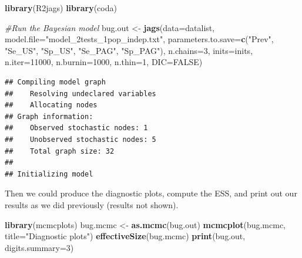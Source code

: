 \documentclass[
]{book}
\newenvironment{Shaded}{\begin{snugshade}}{\end{snugshade}}
\newcommand{\AttributeTok}[1]{\textcolor[rgb]{0.13,0.29,0.53}{#1}}
\newcommand{\CommentTok}[1]{\textcolor[rgb]{0.56,0.35,0.01}{\textit{#1}}}
\newcommand{\ConstantTok}[1]{\textcolor[rgb]{0.56,0.35,0.01}{#1}}
\newcommand{\DecValTok}[1]{\textcolor[rgb]{0.00,0.00,0.81}{#1}}
\newcommand{\FunctionTok}[1]{\textcolor[rgb]{0.13,0.29,0.53}{\textbf{#1}}}
\newcommand{\NormalTok}[1]{#1}
\newcommand{\OtherTok}[1]{\textcolor[rgb]{0.56,0.35,0.01}{#1}}
\newcommand{\StringTok}[1]{\textcolor[rgb]{0.31,0.60,0.02}{#1}}
\begin{document}
\begin{Shaded}
\begin{Highlighting}[]
\FunctionTok{library}\NormalTok{(R2jags)}
\FunctionTok{library}\NormalTok{(coda)}

\CommentTok{\#Run the Bayesian model}
\NormalTok{bug.out }\OtherTok{\textless{}{-}} \FunctionTok{jags}\NormalTok{(}\AttributeTok{data=}\NormalTok{datalist,                             }
               \AttributeTok{model.file=}\StringTok{"model\_2tests\_1pop\_indep.txt"}\NormalTok{,     }
               \AttributeTok{parameters.to.save=}\FunctionTok{c}\NormalTok{(}\StringTok{"Prev"}\NormalTok{, }\StringTok{"Se\_US"}\NormalTok{, }\StringTok{"Sp\_US"}\NormalTok{, }\StringTok{"Se\_PAG"}\NormalTok{, }\StringTok{"Sp\_PAG"}\NormalTok{),               }
               \AttributeTok{n.chains=}\DecValTok{3}\NormalTok{,                                 }
               \AttributeTok{inits=}\NormalTok{inits,                                }
               \AttributeTok{n.iter=}\DecValTok{11000}\NormalTok{,                                }
               \AttributeTok{n.burnin=}\DecValTok{1000}\NormalTok{,                              }
               \AttributeTok{n.thin=}\DecValTok{1}\NormalTok{,                                   }
               \AttributeTok{DIC=}\ConstantTok{FALSE}\NormalTok{)                                   }
\end{Highlighting}
\end{Shaded}

\begin{verbatim}
## Compiling model graph
##    Resolving undeclared variables
##    Allocating nodes
## Graph information:
##    Observed stochastic nodes: 1
##    Unobserved stochastic nodes: 5
##    Total graph size: 32
## 
## Initializing model
\end{verbatim}

Then we could produce the diagnostic plots, compute the ESS, and print out our results as we did previously (results not shown).

\begin{Shaded}
\begin{Highlighting}[]
\FunctionTok{library}\NormalTok{(mcmcplots)}
\NormalTok{bug.mcmc }\OtherTok{\textless{}{-}} \FunctionTok{as.mcmc}\NormalTok{(bug.out)          }
\FunctionTok{mcmcplot}\NormalTok{(bug.mcmc, }\AttributeTok{title=}\StringTok{"Diagnostic plots"}\NormalTok{) }
\FunctionTok{effectiveSize}\NormalTok{(bug.mcmc)}
\FunctionTok{print}\NormalTok{(bug.out, }\AttributeTok{digits.summary=}\DecValTok{3}\NormalTok{) }
\end{Highlighting}
\end{Shaded}
\end{document}
